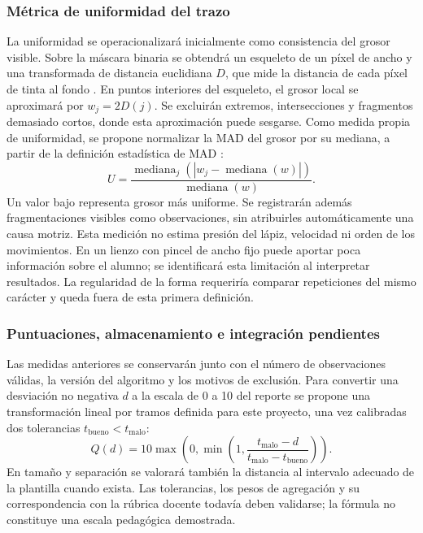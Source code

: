 \subsubsection{Métrica de uniformidad del trazo}
La uniformidad se operacionalizará inicialmente como consistencia del grosor visible. Sobre la máscara binaria se obtendrá un esqueleto de un píxel de ancho y una transformada de distancia euclidiana $D$, que mide la distancia de cada píxel de tinta al fondo \cite{opencvMetricas}. En puntos interiores del esqueleto, el grosor local se aproximará por $w_j=2D(j)$. Se excluirán extremos, intersecciones y fragmentos demasiado cortos, donde esta aproximación puede sesgarse. Como medida propia de uniformidad, se propone normalizar la MAD del grosor por su mediana, a partir de la definición estadística de MAD \cite{nistScale}:
\begin{equation}
 U=\frac{\operatorname{mediana}_j\left(|w_j-\operatorname{mediana}(w)|\right)}
 {\operatorname{mediana}(w)}.
\end{equation}
Un valor bajo representa grosor más uniforme. Se registrarán además fragmentaciones visibles como observaciones, sin atribuirles automáticamente una causa motriz. Esta medición no estima presión del lápiz, velocidad ni orden de los movimientos. En un lienzo con pincel de ancho fijo puede aportar poca información sobre el alumno; se identificará esta limitación al interpretar resultados. La regularidad de la forma requeriría comparar repeticiones del mismo carácter y queda fuera de esta primera definición.

\subsubsection{Puntuaciones, almacenamiento e integración pendientes}
Las medidas anteriores se conservarán junto con el número de observaciones válidas, la versión del algoritmo y los motivos de exclusión. Para convertir una desviación no negativa $d$ a la escala de 0 a 10 del reporte se propone una transformación lineal por tramos definida para este proyecto, una vez calibradas dos tolerancias $t_{\mathrm{bueno}}<t_{\mathrm{malo}}$:
\begin{equation}
 Q(d)=10\max\left(0,\min\left(1,
 \frac{t_{\mathrm{malo}}-d}{t_{\mathrm{malo}}-t_{\mathrm{bueno}}}\right)\right).
\end{equation}
En tamaño y separación se valorará también la distancia al intervalo adecuado de la plantilla cuando exista. Las tolerancias, los pesos de agregación y su correspondencia con la rúbrica docente todavía deben validarse; la fórmula no constituye una escala pedagógica demostrada.

